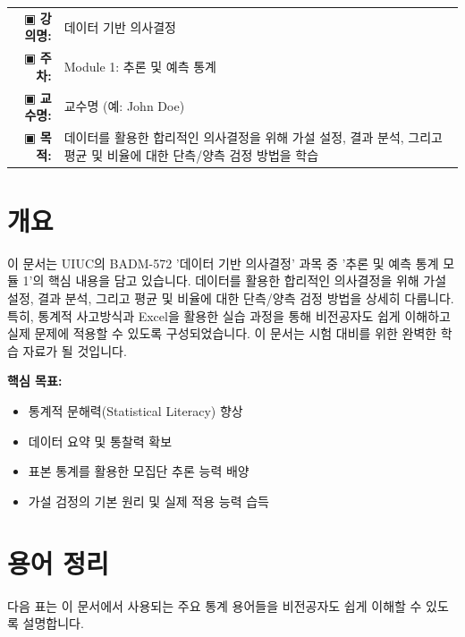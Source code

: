 \documentclass[11pt,a4paper]{article}
\makeatletter
\theoremstyle{definition}
\newcommand{\metainfo}[4]{
\begin{tcolorbox}[
    colback=lightpurple,
    colframe=darkpurple,
    boxrule=1pt,
    arc=2mm,
    left=10pt,
    right=10pt,
    top=8pt,
    bottom=8pt
]
\begin{tabular}{@{}rl@{}}
▣ \textbf{강의명:} & #1 \\[0.3em]
▣ \textbf{주차:} & #2 \\[0.3em]
▣ \textbf{교수명:} & #3 \\[0.3em]
▣ \textbf{목적:} & \begin{minipage}[t]{0.75\textwidth}#4\end{minipage}
\end{tabular}
\end{tcolorbox}
}
\makeatother
\begin{document}
\thispagestyle{firstpage}

\metainfo{데이터 기반 의사결정}{Module 1: 추론 및 예측 통계}{교수명 (예: John Doe)}{데이터를 활용한 합리적인 의사결정을 위해 가설 설정, 결과 분석, 그리고 평균 및 비율에 대한 단측/양측 검정 방법을 학습}

\tableofcontents

\newpage
\section*{개요}
이 문서는 UIUC의 BADM-572 '데이터 기반 의사결정' 과목 중 '추론 및 예측 통계 모듈 1'의 핵심 내용을 담고 있습니다.
데이터를 활용한 합리적인 의사결정을 위해 가설 설정, 결과 분석, 그리고 평균 및 비율에 대한 단측/양측 검정 방법을 상세히 다룹니다.
특히, 통계적 사고방식과 Excel을 활용한 실습 과정을 통해 비전공자도 쉽게 이해하고 실제 문제에 적용할 수 있도록 구성되었습니다.
이 문서는 시험 대비를 위한 완벽한 학습 자료가 될 것입니다.

\vspace{1em}

\begin{summarybox}
\textbf{핵심 목표:}
\begin{itemize}
    \item 통계적 문해력(Statistical Literacy) 향상
    \item 데이터 요약 및 통찰력 확보
    \item 표본 통계를 활용한 모집단 추론 능력 배양
    \item 가설 검정의 기본 원리 및 실제 적용 능력 습득
\end{itemize}
\end{summarybox}

\newpage
\section*{용어 정리}

다음 표는 이 문서에서 사용되는 주요 통계 용어들을 비전공자도 쉽게 이해할 수 있도록 설명합니다.
\end{document}
